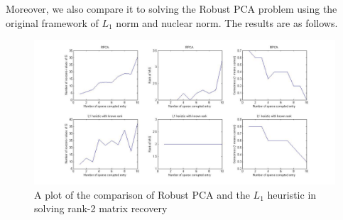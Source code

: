 Moreover, we also compare it to solving the Robust PCA problem using the original framework of $L_1$ norm and nuclear norm. The results are as follows.

\begin{figure}[h!]
\label{fig:rank2}
\centering
\includegraphics[width=16cm]{../figures/comparisonwithrank2.jpg}
\caption{A plot of the comparison of Robust PCA and the $L_1$ heuristic in solving rank-2 matrix recovery}
\end{figure}